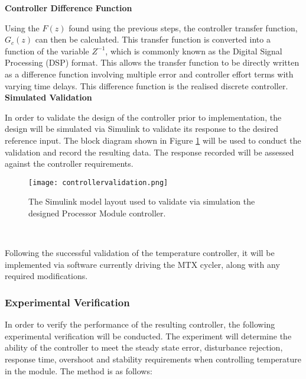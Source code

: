 \textbf{Controller Difference Function}

Using the $F(z)$ found using the previous steps, the controller transfer function, $G_c(z)$ can then be calculated. This transfer function is converted into a function of the variable $Z^{-1}$, which is commonly known as the Digital Signal Processing (DSP) format. This allows the transfer function to be directly written as a difference function involving multiple error and controller effort terms with varying time delays. This difference function is the realised discrete controller.\\

\textbf{Simulated Validation}

In order to validate the design of the controller prior to implementation, the design will be simulated via Simulink to validate its response to the desired reference input. The block diagram shown in Figure \ref{fig:controllervalidation} will be used to conduct the validation and record the resulting data. The response recorded will be assessed against the controller requirements.

\begin{figure}[!htb]
	\centering
	\texttt{[image: controllervalidation.png]}
	\caption[Controller valiation Simulink Model.]{The Simulink model layout used to validate via simulation the designed Processor Module controller.}
	\label{fig:controllervalidation}
\end{figure} 

Following the successful validation of the temperature controller, it will be implemented via software currently driving the MTX cycler, along with any required modifications.

\subsubsection{Experimental Verification}
\label{sec:expver}

In order to verify the performance of the resulting controller, the following experimental verification will be conducted. The experiment will determine the ability of the controller to meet the steady state error, disturbance rejection, response time, overshoot and stability requirements when controlling temperature in the module. The method is as follows:

